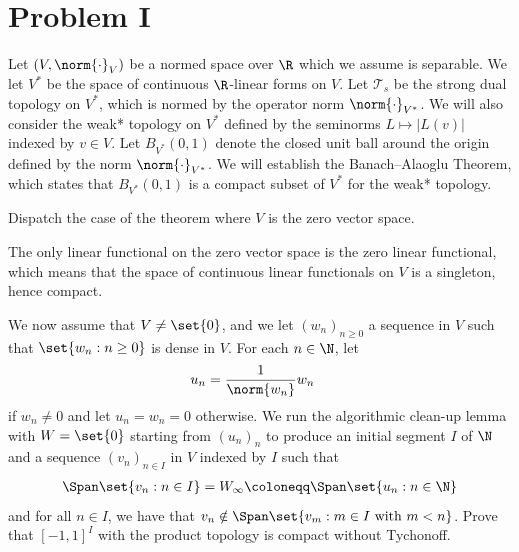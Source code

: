 \documentclass[10pt]{mypackage}
\renewcommand{\coloneq}{\coloneqq}
\begin{document}
\RaggedRight
\section{Problem I}%
Let $\left( V,\norm{\cdot}_{V} \right)$ be a normed space over $\R$ which we assume is separable. We let $V^{\ast}$ be the space of continuous $\R$-linear forms on $V$. Let $\mathcal{T}_s$ be the strong dual topology on $V^{\ast}$, which is normed by the operator norm $\norm{\cdot}_{V^{\ast}}$. We will also consider the weak* topology on $V^{\ast}$ defined by the seminorms $L\mapsto \left\vert L(v) \right\vert$ indexed by $v\in V$. Let $B_{V^{\ast}}\left( 0,1 \right)$ denote the closed unit ball around the origin defined by the norm $\norm{\cdot}_{V^{\ast}}$. We will establish the Banach--Alaoglu Theorem, which states that $B_{V^{\ast}}\left( 0,1 \right)$ is a compact subset of $V^{\ast}$ for the weak* topology.
\begin{problem}[Problem I.1]
  Dispatch the case of the theorem where $V$ is the zero vector space.
\end{problem}
\begin{solution}
  The only linear functional on the zero vector space is the zero linear functional, which means that the space of continuous linear functionals on $V$ is a singleton, hence compact.
\end{solution}
\begin{problem}[Problem I.2]
  We now assume that $V\neq \set{0}$, and we let $\left( w_n \right)_{n\geq 0}$ a sequence in $V$ such that $\set{w_n : n\geq 0}$ is dense in $V$. For each $n\in \N$, let
  \begin{align*}
    u_n &= \frac{1}{\norm{w_n}}w_n
  \end{align*}
  if $w_n\neq 0$ and let $u_n = w_n = 0$ otherwise. We run the algorithmic clean-up lemma with $W = \set{0}$ starting from $\left( u_n \right)_{n}$ to produce an initial segment $I$ of $\N$ and a sequence $\left( v_n \right)_{n\in I}$ in $V$ indexed by $I$ such that
  \begin{align*}
    \Span\set{v_n : n\in I} = W_{\infty} \coloneq \Span\set{u_n : n\in \N}
  \end{align*}
  and for all $n\in I$, we have that $v_n\notin \Span\set{v_m : m\in I\text{ with }m < n}$. Prove that $\left[ -1,1 \right]^{I}$ with the product topology is compact without Tychonoff.
\end{problem}
\end{document}
